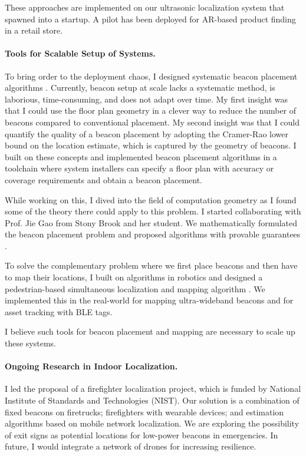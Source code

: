 \documentclass[10pt]{article}
\begin{document}
These approaches are implemented on our ultrasonic localization system that spawned into a startup. A pilot has been deployed for AR-based product finding in a retail store. 

\paragraph{Tools for Scalable Setup of Systems.  }

To bring order to the deployment chaos, I designed systematic beacon placement algorithms \cite{rajagopal2016beacon}. Currently, beacon setup at scale lacks a systematic method, is laborious, time-consuming, and does not adapt over time. 
My first insight was that I could use the floor plan geometry in a clever way to reduce the number of beacons compared to conventional placement. 
My second insight was that I could quantify the quality of a beacon placement by adopting the Cramer-Rao lower bound on the location estimate, which is captured by the geometry of beacons. I built on these concepts and implemented beacon placement algorithms in a toolchain where system installers can specify a floor plan with accuracy or coverage requirements and obtain a beacon placement. 

While working on this, I dived into the field of computation geometry as I found some of the theory there could apply to this problem. 
I started collaborating with Prof. Jie Gao from Stony Brook and her student. 
We mathematically formulated the beacon placement problem and proposed algorithms with provable guarantees \cite{beaconplacementtheory}.  

To solve the complementary problem where we first place beacons and then have to map their locations, I built on algorithms in robotics and designed a pedestrian-based simultaneous localization and mapping algorithm \cite{mobileAR}. We implemented this in the real-world for mapping ultra-wideband beacons and for asset tracking with BLE tags. 

I believe such tools for beacon placement and mapping are necessary to scale up these systems.

\paragraph{Ongoing Research in Indoor Localization. }
I led the proposal of a firefighter localization project, which is funded by National Institute of Standards and Technologies (NIST). Our solution is a combination of fixed beacons on firetrucks; firefighters with wearable devices; and estimation algorithms based on mobile network localization. We are exploring the possibility of exit signs as potential locations for low-power beacons in emergencies. 
In future, I would integrate a network of drones for increasing resilience. 
\end{document}
